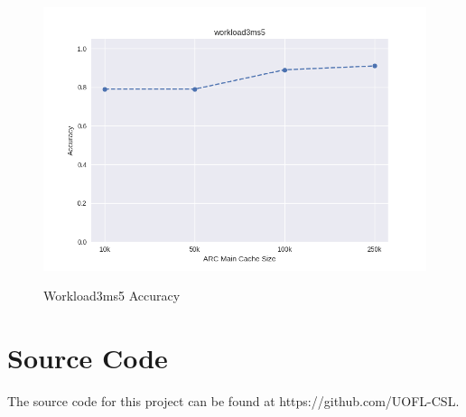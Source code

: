 \documentclass[MEng]{uofl}
\begin{document}
\begin{figure}
    \caption{Workload3ms5 Accuracy}
    \includegraphics[width=\columnwidth]{workload3ms5.png}
    \label{w3ms5}
\end{figure}

\chapter{Source Code}

The source code for this project can be found at https://github.com/UOFL-CSL.



\nocite{vStream}
\nocite{streampc}
\nocite{ladaptivereplace}
\nocite{2Q}

\end{document}
